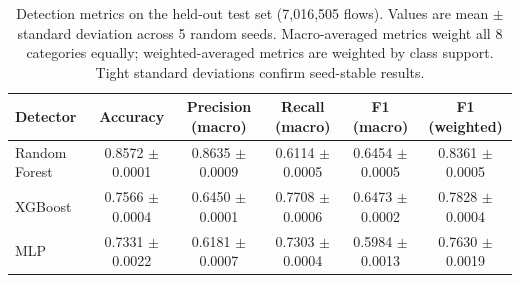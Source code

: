 \begin{table}[t]
\centering
\caption{Detection metrics on the held-out test set (7{,}016{,}505 flows). Values are mean $\pm$ standard deviation across 5 random seeds. Macro-averaged metrics weight all 8 categories equally; weighted-averaged metrics are weighted by class support. Tight standard deviations confirm seed-stable results.}
\label{tab:detection_metrics}
\small
\begin{tabular}{lccccc}
\toprule
Detector & Accuracy & Precision (macro) & Recall (macro) & F1 (macro) & F1 (weighted) \\
\midrule
Random Forest & 0.8572 $\pm$ 0.0001 & 0.8635 $\pm$ 0.0009 & 0.6114 $\pm$ 0.0005 & 0.6454 $\pm$ 0.0005 & 0.8361 $\pm$ 0.0005 \\
XGBoost & 0.7566 $\pm$ 0.0004 & 0.6450 $\pm$ 0.0001 & 0.7708 $\pm$ 0.0006 & 0.6473 $\pm$ 0.0002 & 0.7828 $\pm$ 0.0004 \\
MLP & 0.7331 $\pm$ 0.0022 & 0.6181 $\pm$ 0.0007 & 0.7303 $\pm$ 0.0004 & 0.5984 $\pm$ 0.0013 & 0.7630 $\pm$ 0.0019 \\
\bottomrule
\end{tabular}
\end{table}